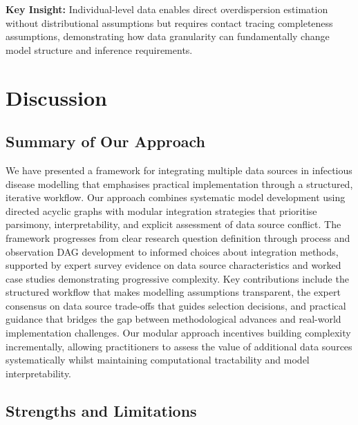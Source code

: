 \documentclass{article}
\begin{document}
\textbf{Key Insight:} Individual-level data enables direct overdispersion estimation without distributional assumptions but requires contact tracing completeness assumptions, demonstrating how data granularity can fundamentally change model structure and inference requirements.

\section{Discussion}

\subsection{Summary of Our Approach}

We have presented a framework for integrating multiple data sources in infectious disease modelling that emphasises practical implementation through a structured, iterative workflow.
Our approach combines systematic model development using directed acyclic graphs with modular integration strategies that prioritise parsimony, interpretability, and explicit assessment of data source conflict.
The framework progresses from clear research question definition through process and observation DAG development to informed choices about integration methods, supported by expert survey evidence on data source characteristics and worked case studies demonstrating progressive complexity.
Key contributions include the structured workflow that makes modelling assumptions transparent, the expert consensus on data source trade-offs that guides selection decisions, and practical guidance that bridges the gap between methodological advances and real-world implementation challenges.
Our modular approach incentives building complexity incrementally, allowing practitioners to assess the value of additional data sources systematically whilst maintaining computational tractability and model interpretability.

\subsection{Strengths and Limitations}
\end{document}
